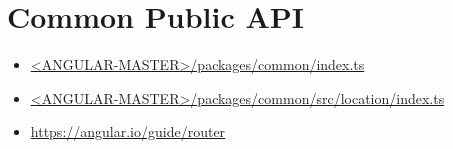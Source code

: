 \section{Common Public API}



\begin{itemize}
  \item \href{https://github.com/angular/angular/blob/master/packages/common/index.ts}
        {<ANGULAR-MASTER>/packages/common/index.ts}
\end{itemize}












\begin{itemize}
  \item \href{https://github.com/angular/angular/blob/master/packages/common/src/location/index.ts}
        {<ANGULAR-MASTER>/packages/common/src/location/index.ts}
\end{itemize}





\begin{itemize}
  \item \url{https://angular.io/guide/router}
\end{itemize}

